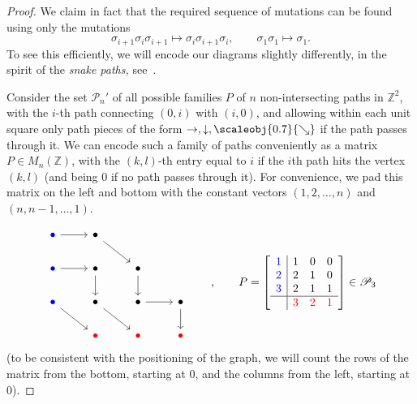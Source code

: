 \documentclass[11pt, reqno]{amsart}
\theoremstyle{definition}
\numberwithin{equation}{section}
\def\Z{\mathbb Z}
\newcommand{\sears}{\scaleobj{0.7}{\searrow}}
\newcommand{\msP}{\mathscr{P}}
\begin{document}
\begin{proof}
We claim in fact that the required sequence of mutations can be found using only the mutations 
\begin{equation}\label{EqBraidMoves}
\sigma_{i+1}\sigma_i \sigma_{i+1} \mapsto \sigma_i \sigma_{i+1} \sigma_i,\qquad \sigma_1\sigma_1 \mapsto \sigma_1. 
\end{equation}
To see this efficiently, we will encode our diagrams slightly differently, in the spirit of the \emph{snake paths,} see~\cite{FG06}.

Consider the set $\msP_n'$ of all possible families $P$ of $n$ non-intersecting  paths in $\Z^2$, with the $i$-th path connecting $(0,i)$ with $(i,0)$, and allowing within each unit square only path pieces of the form $\rightarrow,\downarrow, \sears$ if the path passes through it. We can encode such a family of paths conveniently as a matrix $P \in M_n(\Z)$, with the $(k,l)$-th entry equal to $i$ if the $i$th path hits the vertex $(k,l)$ (and being $0$ if no path passes through it). For convenience, we pad this matrix on the left and bottom with the constant vectors $(1,2,\ldots,n)$ and $(n,n-1,\ldots,1)$.

\[\begin{tikzcd}
	\color{blue}{\bullet} & \bullet \\
	\color{blue}{\bullet}& \bullet & \bullet \\
	\color{blue}{\bullet} & \bullet & \bullet & \bullet \\
	& \color{red}{\bullet} & \color{red}{\bullet} & \color{red}{\bullet}
	\arrow[from=1-1, to=1-2]
	\arrow[from=1-2, to=2-3]
	\arrow[from=2-1, to=2-2]
	\arrow[from=2-2, to=3-2]
	\arrow[from=2-3, to=3-3]
	\arrow[from=3-1, to=4-2]
	\arrow[from=3-2, to=4-3]
	\arrow[from=3-3, to=3-4]
	\arrow[from=3-4, to=4-4]
\end{tikzcd}\qquad,\qquad  
P = \left[
\begin{array}{c|ccc}
  \textcolor{blue}{1}  & 1 & 0 &0 \\ \textcolor{blue}{2} & 2 & 1 & 0 \\ \textcolor{blue}{3} & 2 & 1 &1 \\
  \hline  & \textcolor{red}{3} & \textcolor{red}{2} & \textcolor{red}{1} 
\end{array}
\right] \in \msP_3 
\]
(to be consistent with the positioning of the graph, we will count the rows of the matrix from the bottom, starting at $0$, and the columns from the left, starting at $0$).


\end{proof}
\end{document}

